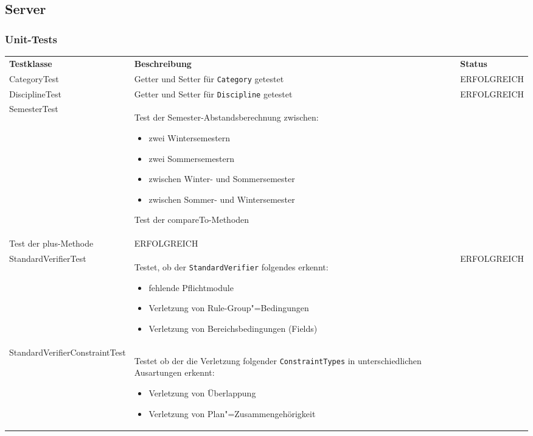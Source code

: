 \FloatBarrier
\subsection{Server}

\subsubsection*{Unit-Tests}

\begin{longtable}{| >{\hspace{0pt}} p{} | >{\hspace{0pt}} p{} | >{\hspace{0pt}} p{} |}
	\hline
	\textbf{Testklasse} & \textbf{Beschreibung} & \textbf{Status} \\ 
	\hhline{|=|=|=|}  
	\endfirsthead
	\endhead
	CategoryTest & Getter und Setter für \texttt{Category} getestet & ERFOLGREICH \\
	\hline
	DisciplineTest & Getter und Setter für \texttt{Discipline} getestet & ERFOLGREICH \\
	\hline
	SemesterTest & Test der Semester-Abstandsberechnung zwischen:
	\begin{itemize}
		\item zwei Wintersemestern
		\item zwei Sommersemestern
		\item zwischen Winter- und Sommersemester
		\item zwischen Sommer- und Wintersemester
	\end{itemize}
	Test der compareTo-Methoden \\
	Test der plus-Methode & ERFOLGREICH \\
	\hline
	StandardVerifierTest & Testet, ob der \texttt{StandardVerifier} folgendes erkennt:
	\begin{itemize}
		\item fehlende Pflichtmodule
		\item Verletzung von Rule-Group"=Bedingungen
		\item Verletzung von Bereichsbedingungen (Fields)
	\end{itemize} & ERFOLGREICH \\
	\hline
	StandardVerifierConstraintTest & Testet ob der die Verletzung folgender \texttt{ConstraintTypes} in unterschiedlichen Ausartungen erkennt:
	\begin{itemize}
		\item Verletzung von Überlappung 
		\item Verletzung von Plan"=Zusammengehörigkeit 

\end{itemize}
\end{longtable}
